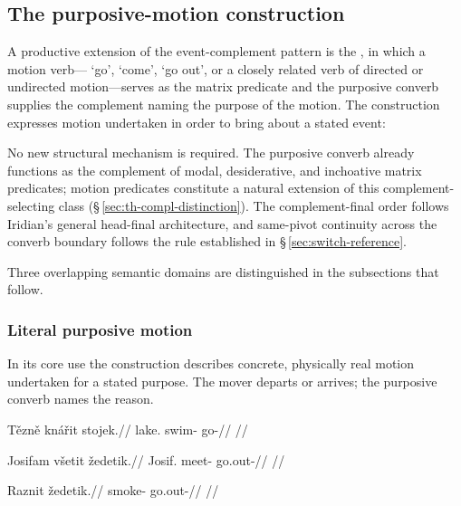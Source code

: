 \subsection{The purposive-motion construction}\label{sec:purp-motion}

A productive extension of the event-complement pattern is the
, in which a motion verb--- `go',
 `come',  `go out', or a closely related verb of directed
or undirected motion---serves as the matrix predicate and the purposive converb
supplies the complement naming the purpose of the motion. The construction
expresses motion undertaken in order to bring about a stated event:

\begin{center}
\end{center}

\noindent No new structural mechanism is required. The purposive converb already
functions as the complement of modal, desiderative, and inchoative matrix
predicates; motion predicates constitute a natural extension of this
complement-selecting class (§\,\ref{sec:th-compl-distinction}). The
complement-final order follows Iridian's general head-final architecture, and
same-pivot continuity across the converb boundary follows the rule established
in §\,\ref{sec:switch-reference}.

Three overlapping semantic domains are distinguished in the subsections that
follow.

\subsubsection{Literal purposive motion}\label{sec:purp-motion-literal}

In its core use the construction describes concrete, physically real motion
undertaken for a stated purpose. The mover departs or arrives; the purposive
converb names the reason.

\ex\label{ex:purp-swim}
\begingl
\gla Tězně knářit stojek.//
\glb lake.\Ind{} swim-\Purp{} go-\Pf{}//
\glft {}//
\endgl
\xe

\ex\label{ex:purp-meet}
\begingl
\gla Josifam všetit žedetik.//
\glb Josif.\Ind{} meet-\Purp{} go.out-\Pf{}//
\glft {}//
\endgl
\xe

\ex\label{ex:purp-smoke}
\begingl
\gla Raznit žedetik.//
\glb smoke-\Purp{} go.out-\Pf{}//
\glft {}//
\endgl
\xe

